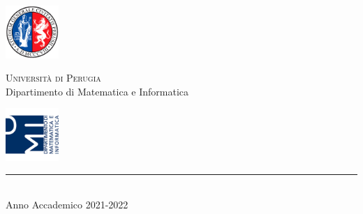 
\thispagestyle{empty} %

	\noindent %
	\includegraphics[width=0.15\textwidth]{img/logoUniPg}
	\begin{minipage}[b]{0.7\textwidth}
		\centering
		{\Large {\textsc{Universit{\`a} di Perugia}}}\\
		\vspace{0.4 em}
		{\large {Dipartimento di Matematica e Informatica}}
		\vspace{0.6 em}
	\end{minipage}%
	\includegraphics[width=0.15\textwidth]{img/logoDMI}
	
	\vspace{5 em}

	\begin{center}
		
		{\large {\textsc{\esame}}} %
		\vspace{8 em}
		
		{\Huge {\titolo}} %
		\vspace{10 em}
		

		\vspace{6 em}
		\vfill
		
	    {\rule{380pt}{.4pt}}\\
		\vspace{1.2 em}
		\large{{Anno Accademico 2021-2022}} %
		
		
		
		
	\end{center}

